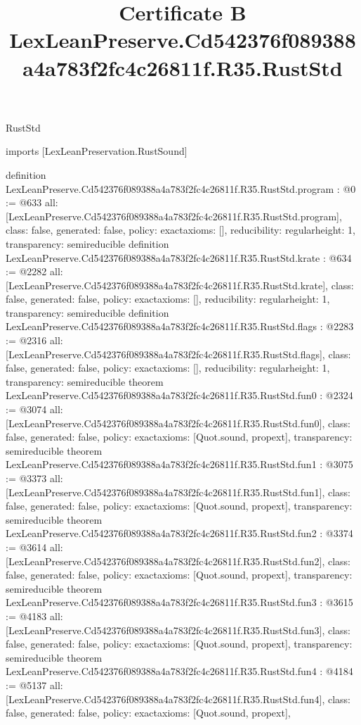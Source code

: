 \begin{lexlean}{RustStd}
\title{Certificate B LexLeanPreserve.Cd542376f089388a4a783f2fc4c26811f.R35.RustStd}
\begin{coremodule}
imports [LexLeanPreservation.RustSound]

definition LexLeanPreserve.Cd542376f089388a4a783f2fc4c26811f.R35.RustStd.program : @0 := @633 {
  all: [LexLeanPreserve.Cd542376f089388a4a783f2fc4c26811f.R35.RustStd.program],
  class: false,
  generated: false,
  policy: exact{axioms: []},
  reducibility: regular{height: 1},
  transparency: semireducible
}
definition LexLeanPreserve.Cd542376f089388a4a783f2fc4c26811f.R35.RustStd.krate : @634 := @2282 {
  all: [LexLeanPreserve.Cd542376f089388a4a783f2fc4c26811f.R35.RustStd.krate],
  class: false,
  generated: false,
  policy: exact{axioms: []},
  reducibility: regular{height: 1},
  transparency: semireducible
}
definition LexLeanPreserve.Cd542376f089388a4a783f2fc4c26811f.R35.RustStd.flags : @2283 := @2316 {
  all: [LexLeanPreserve.Cd542376f089388a4a783f2fc4c26811f.R35.RustStd.flags],
  class: false,
  generated: false,
  policy: exact{axioms: []},
  reducibility: regular{height: 1},
  transparency: semireducible
}
theorem LexLeanPreserve.Cd542376f089388a4a783f2fc4c26811f.R35.RustStd.fun0 : @2324 := @3074 {
  all: [LexLeanPreserve.Cd542376f089388a4a783f2fc4c26811f.R35.RustStd.fun0],
  class: false,
  generated: false,
  policy: exact{axioms: [Quot.sound, propext]},
  transparency: semireducible
}
theorem LexLeanPreserve.Cd542376f089388a4a783f2fc4c26811f.R35.RustStd.fun1 : @3075 := @3373 {
  all: [LexLeanPreserve.Cd542376f089388a4a783f2fc4c26811f.R35.RustStd.fun1],
  class: false,
  generated: false,
  policy: exact{axioms: [Quot.sound, propext]},
  transparency: semireducible
}
theorem LexLeanPreserve.Cd542376f089388a4a783f2fc4c26811f.R35.RustStd.fun2 : @3374 := @3614 {
  all: [LexLeanPreserve.Cd542376f089388a4a783f2fc4c26811f.R35.RustStd.fun2],
  class: false,
  generated: false,
  policy: exact{axioms: [Quot.sound, propext]},
  transparency: semireducible
}
theorem LexLeanPreserve.Cd542376f089388a4a783f2fc4c26811f.R35.RustStd.fun3 : @3615 := @4183 {
  all: [LexLeanPreserve.Cd542376f089388a4a783f2fc4c26811f.R35.RustStd.fun3],
  class: false,
  generated: false,
  policy: exact{axioms: [Quot.sound, propext]},
  transparency: semireducible
}
theorem LexLeanPreserve.Cd542376f089388a4a783f2fc4c26811f.R35.RustStd.fun4 : @4184 := @5137 {
  all: [LexLeanPreserve.Cd542376f089388a4a783f2fc4c26811f.R35.RustStd.fun4],
  class: false,
  generated: false,
  policy: exact{axioms: [Quot.sound, propext]},
}
\end{coremodule}
\end{lexlean}
